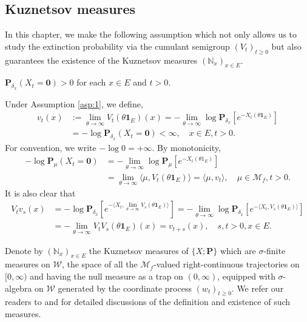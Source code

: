 \subsection{Kuznetsov measures}
	In this chapter, we make the following assumption which not only allows us to study the extinction probability via the cumulant semigroup $(V_t)_{t\geq 0}$ but also guarantees the existence of the Kuznetsov measures $(\mathbb N_x)_{x\in E}$.
\begin{asp}\label{asp:1}
	$\mathbf P_{\delta_x}(X_t = \mathbf 0) > 0$ for each $x \in E$ and $t>0$.
\end{asp}
	Under Assumption \ref{asp:1}, we define,
\begin{equation}\label{eq:V_infty}\begin{split}
	v_t(x)
	&:= \lim_{\theta \to \infty} V_t(\theta \mathbf 1_E)(x)
	= - \lim_{\theta \to \infty} \log \mathbf P_{\delta_x}[e^{-X_t(\theta \mathbf 1_E)}]\\
	&= - \log \mathbf P_{\delta_x}(X_t = \mathbf 0)
	< \infty,
	\quad x \in E, t> 0.
\end{split}\end{equation}
	For convention, we write $-\log 0 = +\infty$.
	By monotonicity,
\begin{equation}\label{eq:linearity}\begin{split}
	-\log \mathbf P_\mu(X_t = \mathbf 0)
	&= -\lim_{\theta \to \infty} \log \mathbf P_{\mu}[e^{-X_t(\theta 1_E)}]\\
	& = \lim_{\theta\to \infty} \langle \mu, V_t(\theta\mathbf 1_E) \rangle
	= \langle \mu, v_t \rangle,
	\quad \mu \in \mathcal M_f, t > 0.
\end{split}\end{equation}
	It is also clear that
\[\begin{split}
	V_t v_s(x)
	&= -\log \mathbf P_{\delta_x}[e^{-\langle X_t,\lim_{\theta\to\infty } V_s(\theta \mathbf 1_E)\rangle}]
	= -\lim_{\theta \to \infty} \log \mathbf P_{\delta_x}[e^{-\langle X_t, V_s(\theta \mathbf 1_E)\rangle}]\\
	&= - \lim_{\theta\to\infty} V_t V_s(\theta \mathbf 1_E)(x)
	= v_{t+s}(x),
	\quad s,t>0, x\in E.
\end{split}\]
\par
	Denote by $(\mathbb N_x)_{x\in E}$
	the Kuznetsov measures of $\{X;\mathbf P\}$ which are $\sigma$-finite measures on $\mathcal W$, the space of all the $\mathcal M_f$-valued right-continuous trajectories on
	$[0,\infty)$ and having the null measure as a trap on $(0,\infty)$,
	equipped with $\sigma$-algebra on $\mathcal W$ generated by the coordinate process $(w_t)_{t\geq 0}$.
	We refer our readers to \cite{DynkinKuznetsov2004mathbb} and \cite[Section 8.4]{Li2011Measure-valued} for detailed discussions of the definition and existence of such measures.

